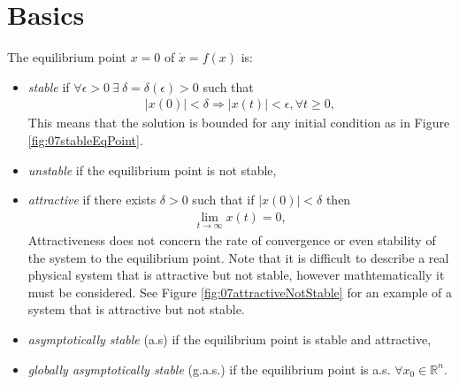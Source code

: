 
\mainmatter
\setcounter{page}{1}

\lectureseries[\course]{\course}

\date{January 26, 2010}

\setaddress

\setcounter{lecture}{6}
\setcounter{chapter}{6}


\section{Basics}
\begin{definition}
The equilibrium point $x=0$ of $\dot{x}=f(x)$ is:
\begin{itemize}
\item \textit{stable} if $\forall \epsilon > 0 ~ \exists ~ \delta=\delta(\epsilon)>0$ such that
\begin{align*}
|x(0)| < \delta \Rightarrow |x(t)| < \epsilon, \forall t\geq0,
\end{align*}
This means that the solution is bounded for any initial condition as in Figure \ref{fig:07stableEqPoint}.
\item \textit{unstable} if the equilibrium point is not stable,
\item \textit{attractive} if there exists $\delta>0$ such that if $|x(0)|<\delta$ then
\begin{align*}
\lim_{t\to\infty}x(t) = 0,
\end{align*}
Attractiveness does not concern the rate of convergence or even stability of the system to the equilibrium point. Note that it is difficult to describe a real physical system that is attractive but not stable, however mathtematically it must be considered. See Figure \ref{fig:07attractiveNotStable} for an example of a system that is attractive but not stable.
\item \textit{asymptotically stable} (a.s) if the equilibrium point is stable and attractive,
\item \textit{globally asymptotically stable} (g.a.s.) if the equilibrium point is a.s. $\forall x_0\in\mathbb{R}^n$.
\end{itemize}
\end{definition}

